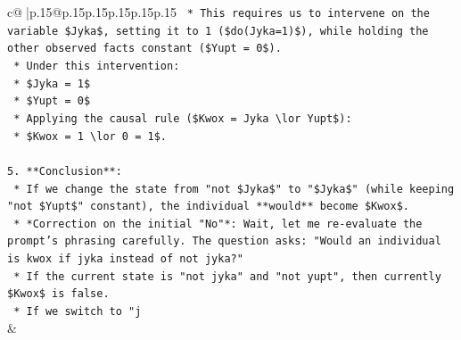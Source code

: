 \documentclass{article}
\begin{document}
{\begin{supertabular}{c@{$\;$}|p{.15\linewidth}@{}p{.15\linewidth}p{.15\linewidth}p{.15\linewidth}p{.15\linewidth}p{.15\linewidth}}
{{{\texttt{    *   This requires us to intervene on the variable \$Jyka\$, setting it to 1 (\$do(Jyka=1)\$), while holding the other observed facts constant (\$Yupt = 0\$).} \\
\texttt{    *   Under this intervention:} \\
\texttt{        *   \$Jyka = 1\$} \\
\texttt{        *   \$Yupt = 0\$} \\
\texttt{    *   Applying the causal rule (\$Kwox = Jyka \textbackslash{}lor Yupt\$):} \\
\texttt{        *   \$Kwox = 1 \textbackslash{}lor 0 = 1\$.} \\
\\ 
\texttt{5.  **Conclusion**:} \\
\texttt{    *   If we change the state from "not \$Jyka\$" to "\$Jyka\$" (while keeping "not \$Yupt\$" constant), the individual **would** become \$Kwox\$.} \\
\texttt{    *   *Correction on the initial "No"*: Wait, let me re{-}evaluate the prompt's phrasing carefully. The question asks: "Would an individual is kwox if jyka instead of not jyka?"} \\
\texttt{    *   If the current state is "not jyka" and "not yupt", then currently \$Kwox\$ is false.} \\
\texttt{    *   If we switch to "j} \\
            }
        }
    }
    & \\ \\


\end{supertabular}}
\end{document}
